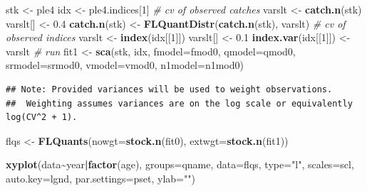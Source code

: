 \documentclass[
]{book}
\newenvironment{Shaded}{\begin{snugshade}}{\end{snugshade}}
\newcommand{\AttributeTok}[1]{\textcolor[rgb]{0.13,0.29,0.53}{#1}}
\newcommand{\CommentTok}[1]{\textcolor[rgb]{0.56,0.35,0.01}{\textit{#1}}}
\newcommand{\DecValTok}[1]{\textcolor[rgb]{0.00,0.00,0.81}{#1}}
\newcommand{\FloatTok}[1]{\textcolor[rgb]{0.00,0.00,0.81}{#1}}
\newcommand{\FunctionTok}[1]{\textcolor[rgb]{0.13,0.29,0.53}{\textbf{#1}}}
\newcommand{\NormalTok}[1]{#1}
\newcommand{\OtherTok}[1]{\textcolor[rgb]{0.56,0.35,0.01}{#1}}
\newcommand{\SpecialCharTok}[1]{\textcolor[rgb]{0.81,0.36,0.00}{\textbf{#1}}}
\newcommand{\StringTok}[1]{\textcolor[rgb]{0.31,0.60,0.02}{#1}}
\begin{document}
\begin{Shaded}
\begin{Highlighting}[]
\NormalTok{stk }\OtherTok{\textless{}{-}}\NormalTok{ ple4}
\NormalTok{idx }\OtherTok{\textless{}{-}}\NormalTok{ ple4.indices[}\DecValTok{1}\NormalTok{]}
\CommentTok{\# cv of observed catches}
\NormalTok{varslt }\OtherTok{\textless{}{-}} \FunctionTok{catch.n}\NormalTok{(stk)}
\NormalTok{varslt[] }\OtherTok{\textless{}{-}} \FloatTok{0.4}
\FunctionTok{catch.n}\NormalTok{(stk) }\OtherTok{\textless{}{-}} \FunctionTok{FLQuantDistr}\NormalTok{(}\FunctionTok{catch.n}\NormalTok{(stk), varslt)}
\CommentTok{\# cv of observed indices}
\NormalTok{varslt }\OtherTok{\textless{}{-}} \FunctionTok{index}\NormalTok{(idx[[}\DecValTok{1}\NormalTok{]])}
\NormalTok{varslt[] }\OtherTok{\textless{}{-}} \FloatTok{0.1}
\FunctionTok{index.var}\NormalTok{(idx[[}\DecValTok{1}\NormalTok{]]) }\OtherTok{\textless{}{-}}\NormalTok{ varslt}
\CommentTok{\# run}
\NormalTok{fit1 }\OtherTok{\textless{}{-}} \FunctionTok{sca}\NormalTok{(stk, idx, }\AttributeTok{fmodel=}\NormalTok{fmod0, }\AttributeTok{qmodel=}\NormalTok{qmod0, }\AttributeTok{srmodel=}\NormalTok{srmod0, }\AttributeTok{vmodel=}\NormalTok{vmod0, }\AttributeTok{n1model=}\NormalTok{n1mod0)}
\end{Highlighting}
\end{Shaded}

\begin{verbatim}
## Note: Provided variances will be used to weight observations.
##  Weighting assumes variances are on the log scale or equivalently log(CV^2 + 1).
\end{verbatim}

\begin{Shaded}
\begin{Highlighting}[]
\NormalTok{flqs }\OtherTok{\textless{}{-}} \FunctionTok{FLQuants}\NormalTok{(}\AttributeTok{nowgt=}\FunctionTok{stock.n}\NormalTok{(fit0), }\AttributeTok{extwgt=}\FunctionTok{stock.n}\NormalTok{(fit1))}
\end{Highlighting}
\end{Shaded}

\begin{Shaded}
\begin{Highlighting}[]
\FunctionTok{xyplot}\NormalTok{(data}\SpecialCharTok{\textasciitilde{}}\NormalTok{year}\SpecialCharTok{|}\FunctionTok{factor}\NormalTok{(age), }\AttributeTok{groups=}\NormalTok{qname, }\AttributeTok{data=}\NormalTok{flqs, }\AttributeTok{type=}\StringTok{"l"}\NormalTok{, }\AttributeTok{scales=}\NormalTok{scl, }\AttributeTok{auto.key=}\NormalTok{lgnd, }\AttributeTok{par.settings=}\NormalTok{pset, }\AttributeTok{ylab=}\StringTok{""}\NormalTok{)}
\end{Highlighting}
\end{Shaded}
\end{document}

